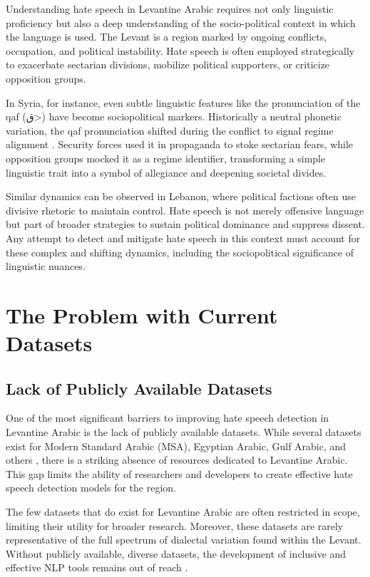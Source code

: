 \documentclass[11pt]{article}
\begin{document}
Understanding hate speech in Levantine Arabic requires not only linguistic proficiency but also a deep understanding of the socio-political context in which the language is used. The Levant is a region marked by ongoing conflicts, occupation, and political instability. Hate speech is often employed strategically to exacerbate sectarian divisions, mobilize political supporters, or criticize opposition groups.

In Syria, for instance, even subtle linguistic features like the pronunciation of the qaf (\<ق>) have become sociopolitical markers. Historically a neutral phonetic variation, the qaf pronunciation shifted during the conflict to signal regime alignment \citep{Omran_2021}. Security forces used it in propaganda to stoke sectarian fears, while opposition groups mocked it as a regime identifier, transforming a simple linguistic trait into a symbol of allegiance and deepening societal divides.

Similar dynamics can be observed in Lebanon, where political factions often use divisive rhetoric to maintain control. Hate speech is not merely offensive language but part of broader strategies to sustain political dominance and suppress dissent. Any attempt to detect and mitigate hate speech in this context must account for these complex and shifting dynamics, including the sociopolitical significance of linguistic nuances.


\section{The Problem with Current Datasets}

\subsection{Lack of Publicly Available Datasets}

One of the most significant barriers to improving hate speech detection in Levantine Arabic is the lack of publicly available datasets. While several datasets exist for Modern Standard Arabic (MSA), Egyptian Arabic, Gulf Arabic, and others \citep{ALAKROT2018174, mubarak-etal-2017-abusive, 10.5555/3382225.3382239, 8593146}, there is a striking absence of resources dedicated to Levantine Arabic. This gap limits the ability of researchers and developers to create effective hate speech detection models for the region.

The few datasets that do exist for Levantine Arabic are often restricted in scope, limiting their utility for broader research. Moreover, these datasets are rarely representative of the full spectrum of dialectal variation found within the Levant. Without publicly available, diverse datasets, the development of inclusive and effective NLP tools remains out of reach \citep{barocas-hardt-narayanan}.
\end{document}
